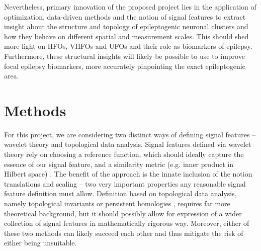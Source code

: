 \documentclass[a4paper,11pt]{scrartcl}
\begin{document}
Nevertheless, primary innovation of the proposed project lies in the application of optimization, data-driven methods and the notion of signal features to extract insight about the structure and topology of epileptogenic neuronal clusters and how they behave on different spatial and measurement scales. This should shed more light on HFOs, VHFOs and \acp{UFO} and their role as biomarkers of epilepsy. Furthermore, these structural insights will likely be possible to use to improve focal epilepsy biomarkers, more accurately pinpointing the exact epileptogenic area.



\section{Methods}\label{sec:methods}

For this project, we are considering two distinct ways of defining signal features -- wavelet theory and topological data analysis. Signal features defined via wavelet theory rely on choosing a reference function, which should ideally capture the essence of our signal feature, and a similarity metric (e.g. inner product in Hilbert space) \cite{Ganjalizadeh2022, Brochard2022, Rocha2011}. The benefit of the approach is the innate inclusion of the notion translations and scaling \cite{Mallat2009} -- two very important properties any reasonable signal feature definition must allow. Definition based on topological data analysis, namely topological invariants or persistent homologies \cite{Carriere2021, Myers2022}, requires far more theoretical background, but it should possibly allow for expression of a wider collection of signal features in mathematically rigorous way. Moreover, either of these two methods can likely succeed each other and thus mitigate the risk of either being unsuitable.
\end{document}
